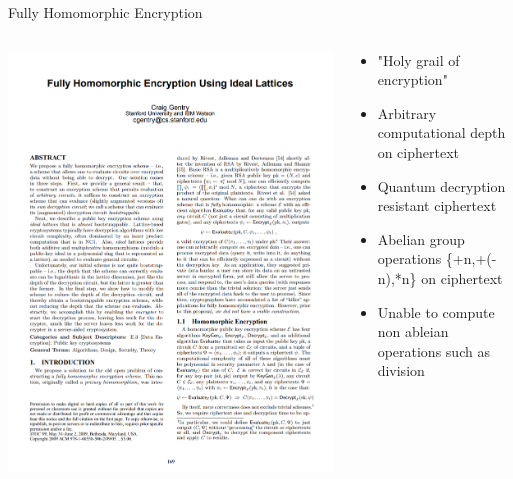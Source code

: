 \documentclass[aspectratio=169]{beamer}
\begin{document}
    \begin{frame}{Fully Homomorphic Encryption}
      \begin{columns}
        \begin{column}{0.5\textwidth}
          \includegraphics[width=0.8\linewidth]{gentry.png}
        \end{column}
        \begin{column}{0.5\textwidth}
          \begin{itemize}
            \item "Holy grail of encryption"
            \item Arbitrary computational depth on ciphertext
            \item Quantum decryption resistant ciphertext
            \item Abelian group operations \{+n,+(-n),*n\} on ciphertext
            \item Unable to compute non ableian operations such as division
          \end{itemize}
        \end{column}
      \end{columns}
    \end{frame}
\end{document}
